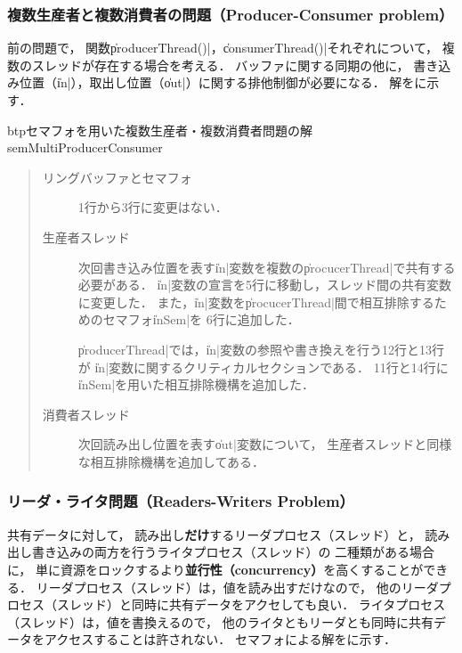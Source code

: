 \subsubsection{複数生産者と複数消費者の問題（Producer-Consumer problem）}
前の問題で，
関数\|producerThread()|，\|consumerThread()|それぞれについて，
複数のスレッドが存在する場合を考える．
バッファに関する同期の他に，
書き込み位置（\|in|），取出し位置（\|out|）に関する排他制御が必要になる．
解をに示す．

\begin{myfig}{btp}{セマフォを用いた複数生産者・複数消費者問題の解}
{semMultiProducerConsumer}

\end{myfig}

\begin{quote}
\begin{description}
\item [リングバッファとセマフォ]
1行から3行に変更はない．

\item [生産者スレッド]
次回書き込み位置を表す\|in|変数を複数の\|procucerThread|で共有する必要がある．
\|in|変数の宣言を5行に移動し，スレッド間の共有変数に変更した．
また，\|in|変数を\|procucerThread|間で相互排除するためのセマフォ\|inSem|を
6行に追加した．

\|producerThread|では，\|in|変数の参照や書き換えを行う12行と13行が
\|in|変数に関するクリティカルセクションである．
11行と14行に\|inSem|を用いた相互排除機構を追加した．

\item [消費者スレッド]
次回読み出し位置を表す\|out|変数について，
生産者スレッドと同様な相互排除機構を追加してある．
\end{description}
\end{quote}

\subsubsection{リーダ・ライタ問題（Readers-Writers Problem）}
共有データに対して，
読み出し{\bf だけ}するリーダプロセス（スレッド）と，
読み出し書き込みの両方を行うライタプロセス（スレッド）の
二種類がある場合に，
単に資源をロックするより{\bf 並行性（concurrency）}を高くすることができる．
リーダプロセス（スレッド）は，値を読み出すだけなので，
他のリーダプロセス（スレッド）と同時に共有データをアクセしても良い．
ライタプロセス（スレッド）は，値を書換えるので，
他のライタともリーダとも同時に共有データをアクセスすることは許されない．
セマフォによる解をに示す．

